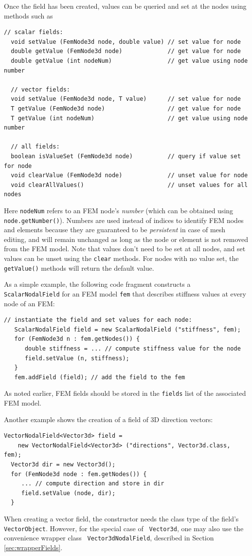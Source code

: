 Once the field has been created, values can be queried and set at the
nodes using methods such as
%
\begin{lstlisting}[]
  // scalar fields:
  void setValue (FemNode3d node, double value) // set value for node
  double getValue (FemNode3d node)             // get value for node
  double getValue (int nodeNum)                // get value using node number

  // vector fields:
  void setValue (FemNode3d node, T value)      // set value for node
  T getValue (FemNode3d node)                  // get value for node
  T getValue (int nodeNum)                     // get value using node number

  // all fields:
  boolean isValueSet (FemNode3d node)          // query if value set for node
  void clearValue (FemNode3d node)             // unset value for node
  void clearAllValues()                        // unset values for all nodes
\end{lstlisting}
%
Here {\tt nodeNum} refers to an FEM node's {\it number} (which can be
obtained using {\tt node.getNumber()}). Numbers are used instead of
indices to identify FEM nodes and elements because they are guaranteed
to be {\it persistent} in case of mesh editing, and will remain
unchanged as long as the node or element is not removed from the FEM
model. Note that values don't need to be set at all nodes, and set
values can be unset using the {\tt clear} methods. For nodes with no
value set, the {\tt getValue()} methods will return the default value.

As a simple example, the following code fragment constructs a {\tt
ScalarNodalField} for an FEM model {\tt fem} that describes stiffness
values at every node of an FEM:
%
\begin{lstlisting}[]
   // instantiate the field and set values for each node:
   ScalarNodalField field = new ScalarNodalField ("stiffness", fem);
   for (FemNode3d n : fem.getNodes()) {
      double stiffness = ... // compute stiffness value for the node
      field.setValue (n, stiffness);
   }
   fem.addField (field); // add the field to the fem
\end{lstlisting}
%
As noted earlier, FEM fields should be stored in the {\tt fields} list
of the associated FEM model.

Another example shows the creation of a field of 3D direction vectors:
%
\begin{lstlisting}[]
  VectorNodalField<Vector3d> field =
    new VectorNodalField<Vector3d> ("directions", Vector3d.class, fem);
  Vector3d dir = new Vector3d();
  for (FemNode3d node : fem.getNodes()) {
     ... // compute direction and store in dir
     field.setValue (node, dir);
  }
\end{lstlisting}
%
When creating a vector field, the constructor needs the class type of
the field's {\tt VectorObject}. However, for the special case of {\tt
Vector3d}, one may also use the convenience wrapper class {\tt
Vector3dNodalField}, described in Section \ref{sec:wrapperFields}.

